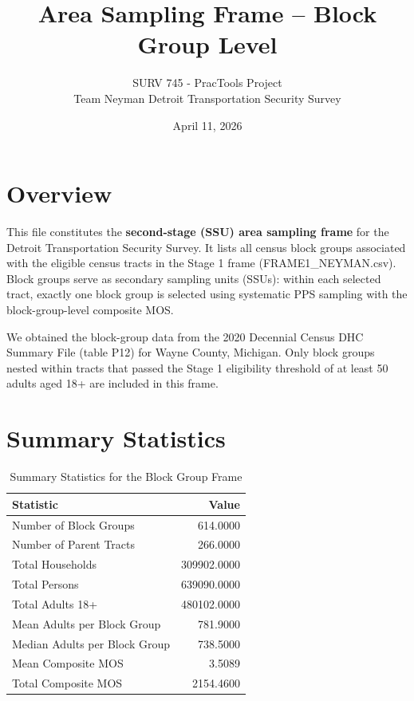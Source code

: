\documentclass[
  11pt,
]{article}
\title{Area Sampling Frame -- Block Group Level}
\subtitle{SURV 745 - PracTools Project\\
Team Neyman \textbar{} Detroit Transportation Security Survey}
\author{}
\date{\vspace{-2.5em}April 11, 2026}
\begin{document}
\maketitle

\section{Overview}\label{overview}

This file constitutes the \textbf{second-stage (SSU) area sampling
frame} for the Detroit Transportation Security Survey. It lists all
census block groups associated with the eligible census tracts in the
Stage 1 frame (FRAME1\_NEYMAN.csv). Block groups serve as secondary
sampling units (SSUs): within each selected tract, exactly one block
group is selected using systematic PPS sampling with the
block-group-level composite MOS.

We obtained the block-group data from the 2020 Decennial Census DHC
Summary File (table P12) for Wayne County, Michigan. Only block groups
nested within tracts that passed the Stage 1 eligibility threshold of at
least 50 adults aged 18+ are included in this frame.

\section{Summary Statistics}\label{summary-statistics}

\begin{table}[!h]
\centering
\caption{\label{tab:summary-stats}Summary Statistics for the Block Group Frame}
\centering
\fontsize{10}{12}\selectfont
\begin{tabular}[t]{lr}
\toprule
Statistic & Value\\
\midrule
Number of Block Groups & 614.0000\\
Number of Parent Tracts & 266.0000\\
Total Households & 309902.0000\\
Total Persons & 639090.0000\\
Total Adults 18+ & 480102.0000\\
Mean Adults per Block Group & 781.9000\\
Median Adults per Block Group & 738.5000\\
Mean Composite MOS & 3.5089\\
Total Composite MOS & 2154.4600\\
\bottomrule
\end{tabular}
\end{table}
\end{document}
